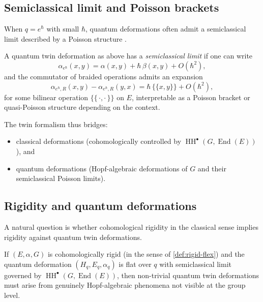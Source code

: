 \documentclass[11pt,a4paper]{article}
\numberwithin{equation}{section}
\DeclareMathOperator{\End}{End}
\DeclareMathOperator{\HH}{HH}
\newcommand{\TwinSpace}{(E,\alpha,G)}
\begin{document}
	\subsection{Semiclassical limit and Poisson brackets}
	
	When $q=e^\hbar$ with small $\hbar$, quantum deformations often admit a semiclassical limit described by a Poisson structure
	\cite{Drinfeld1986,ChariPressley1994}.
	
	\begin{definition}
		A quantum twin deformation as above has a \emph{semiclassical limit} if one can write
		\[
		\alpha_{e^\hbar}(x,y) = \alpha(x,y) + \hbar\,\beta(x,y) + O(\hbar^2),
		\]
		and the commutator of braided operations admits an expansion
		\[
		\alpha_{e^\hbar,R}(x,y) - \alpha_{e^\hbar,R}(y,x) 
		= \hbar\,\{\!\{x,y\}\!\} + O(\hbar^2),
		\]
		for some bilinear operation $\{\!\{\,\cdot,\cdot\,\}\!\}$ on $E$, interpretable as a Poisson bracket
		or quasi-Poisson structure depending on the context.
	\end{definition}
	
	\begin{remark}
		The twin formalism thus bridges:
		\begin{itemize}
			\item classical deformations (cohomologically controlled by $\HH^\bullet(G,\End(E))$), and
			\item quantum deformations (Hopf-algebraic deformations of $G$ and their semiclassical Poisson limits).
		\end{itemize}
	\end{remark}
	
	\subsection{Rigidity and quantum deformations}
	
	A natural question is whether cohomological rigidity in the classical sense implies rigidity against quantum twin deformations.
	
	\begin{proposition}[Heuristic]
		If $\TwinSpace$ is cohomologically rigid (in the sense of \cref{def:rigid-flex}) and the quantum deformation 
		$(H_q,E_q,\alpha_q)$ is flat over $q$ with semiclassical limit governed by $\HH^\bullet(G,\End(E))$, then non-trivial
		quantum twin deformations must arise from genuinely Hopf-algebraic phenomena not visible at the group level.
	\end{proposition}
	
\end{document}
